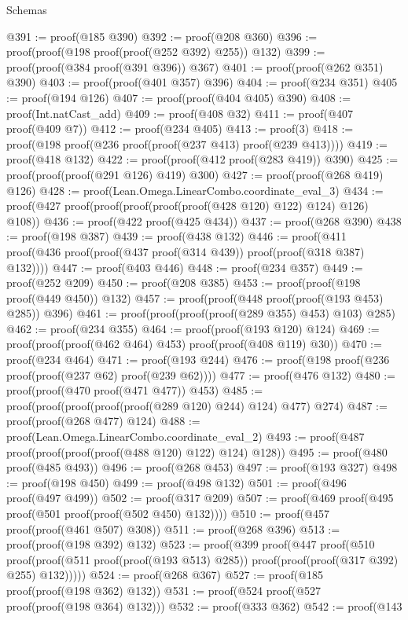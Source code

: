 \begin{lexlean}{Schemas}
\begin{coremodule}
@391 := proof(@185 @390)
@392 := proof(@208 @360)
@396 := proof(proof(@198 proof(proof(@252 @392) @255)) @132)
@399 := proof(proof(@384 proof(@391 @396)) @367)
@401 := proof(proof(@262 @351) @390)
@403 := proof(proof(@401 @357) @396)
@404 := proof(@234 @351)
@405 := proof(@194 @126)
@407 := proof(proof(@404 @405) @390)
@408 := proof(Int.natCast_add)
@409 := proof(@408 @32)
@411 := proof(@407 proof(@409 @7))
@412 := proof(@234 @405)
@413 := proof(3)
@418 := proof(@198 proof(@236 proof(proof(@237 @413) proof(@239 @413))))
@419 := proof(@418 @132)
@422 := proof(proof(@412 proof(@283 @419)) @390)
@425 := proof(proof(proof(@291 @126) @419) @300)
@427 := proof(proof(@268 @419) @126)
@428 := proof(Lean.Omega.LinearCombo.coordinate_eval_3)
@434 := proof(@427 proof(proof(proof(proof(proof(@428 @120) @122) @124) @126) @108))
@436 := proof(@422 proof(@425 @434))
@437 := proof(@268 @390)
@438 := proof(@198 @387)
@439 := proof(@438 @132)
@446 := proof(@411 proof(@436 proof(proof(@437 proof(@314 @439)) proof(proof(@318 @387) @132))))
@447 := proof(@403 @446)
@448 := proof(@234 @357)
@449 := proof(@252 @209)
@450 := proof(@208 @385)
@453 := proof(proof(@198 proof(@449 @450)) @132)
@457 := proof(proof(@448 proof(proof(@193 @453) @285)) @396)
@461 := proof(proof(proof(proof(@289 @355) @453) @103) @285)
@462 := proof(@234 @355)
@464 := proof(proof(@193 @120) @124)
@469 := proof(proof(proof(@462 @464) @453) proof(proof(@408 @119) @30))
@470 := proof(@234 @464)
@471 := proof(@193 @244)
@476 := proof(@198 proof(@236 proof(proof(@237 @62) proof(@239 @62))))
@477 := proof(@476 @132)
@480 := proof(proof(@470 proof(@471 @477)) @453)
@485 := proof(proof(proof(proof(proof(@289 @120) @244) @124) @477) @274)
@487 := proof(proof(@268 @477) @124)
@488 := proof(Lean.Omega.LinearCombo.coordinate_eval_2)
@493 := proof(@487 proof(proof(proof(proof(@488 @120) @122) @124) @128))
@495 := proof(@480 proof(@485 @493))
@496 := proof(@268 @453)
@497 := proof(@193 @327)
@498 := proof(@198 @450)
@499 := proof(@498 @132)
@501 := proof(@496 proof(@497 @499))
@502 := proof(@317 @209)
@507 := proof(@469 proof(@495 proof(@501 proof(proof(@502 @450) @132))))
@510 := proof(@457 proof(proof(@461 @507) @308))
@511 := proof(@268 @396)
@513 := proof(proof(@198 @392) @132)
@523 := proof(@399
      proof(@447
          proof(@510
              proof(proof(@511 proof(proof(@193 @513) @285))
                  proof(proof(proof(@317 @392) @255) @132)))))
@524 := proof(@268 @367)
@527 := proof(@185 proof(proof(@198 @362) @132))
@531 := proof(@524 proof(@527 proof(proof(@198 @364) @132)))
@532 := proof(@333 @362)
@542 := proof(@143

\end{coremodule}
\end{lexlean}
